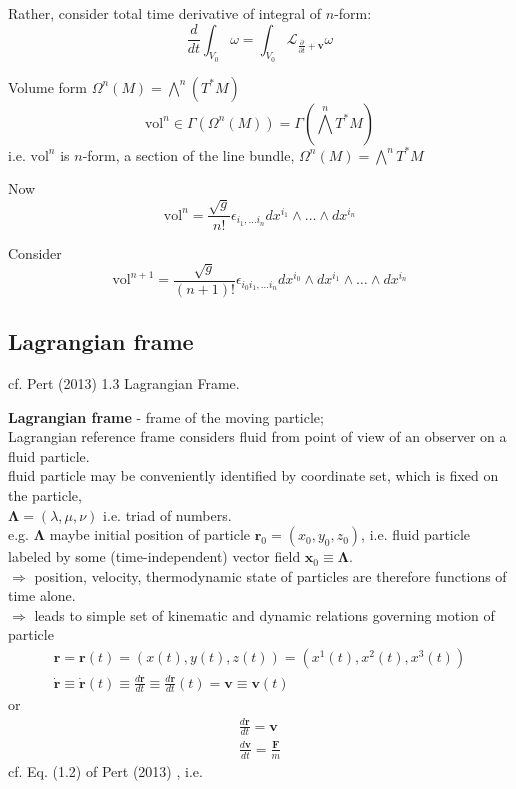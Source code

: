 \documentclass[10pt]{amsart}
\begin{document}
\begin{multicols*}{2}
Rather, consider total time derivative of integral of $n$-form: 
\[
\frac{d}{dt} \int_{V_0} \omega = \int_{V_0} \mathcal{L}_{\frac{\partial}{\partial t} + \mathbf{v} } \omega 
\]

Volume form $\Omega^n(M) = \bigwedge^n (T^*M)$
\[
\text{vol}^n \in \Gamma(\Omega^n(M)) = \Gamma(\bigwedge^n T^*M)
\]
i.e. $\text{vol}^n$ is $n$-form, a section of the line bundle, $\Omega^n(M) = \bigwedge^n T^*M$

Now
\[
\text{vol}^n = \frac{\sqrt{g}}{ n!} \epsilon_{i_1, \dots i_n} dx^{i_1} \wedge \dots \wedge dx^{i_n}
\]

Consider 
\[
\text{vol}^{n+1} = \frac{\sqrt{g}}{ (n+1)!} \epsilon_{i_0 i_1, \dots i_n} dx^{i_0} \wedge dx^{i_1} \wedge \dots \wedge dx^{i_n}
\]

\subsection{Lagrangian frame}

cf. Pert (2013) \cite{Pert2013} 1.3 Lagrangian Frame.

\textbf{Lagrangian frame} - frame of the moving particle; \\
Lagrangian reference frame considers fluid from point of view of an observer on a fluid particle. \\

fluid particle may be conveniently identified by coordinate set, which is fixed on the particle, \\
$\mathbf{\Lambda} = (\lambda, \mu, \nu)$ i.e. triad of numbers. \\
e.g. $\mathbf{\Lambda}$ maybe initial position of particle $\mathbf{r}_0 = (x_0, y_0, z_0)$, i.e. fluid particle labeled by some (time-independent) vector field $\mathbf{x}_0 \equiv \mathbf{\Lambda}$. \\

$\Longrightarrow $ position, velocity, thermodynamic state of particles are therefore functions of time alone. \\
$\Longrightarrow$ leads to simple set of kinematic and dynamic relations governing motion of particle \\
\[
\begin{gathered}
	\mathbf{r} = \mathbf{r}(t) = (x(t), y(t), z(t)) = (x^1(t), x^2(t), x^3(t)) \\ 
	\dot{ \mathbf{r}} \equiv \dot{\mathbf{r}}(t) \equiv \frac{d\mathbf{r}}{dt} \equiv \frac{d\mathbf{r}}{dt} (t) = \mathbf{v} \equiv \mathbf{v}(t)
\end{gathered}
\]
or 
\begin{equation}
\begin{gathered}
\frac{d\mathbf{r}}{dt} = \mathbf{v} \\ 
\frac{d\mathbf{v}}{dt} = \frac{\mathbf{F}}{m}
\end{gathered}
\end{equation}
cf. Eq. (1.2) of Pert (2013) \cite{Pert2013}, i.e. \\


\end{multicols*}
\end{document}
